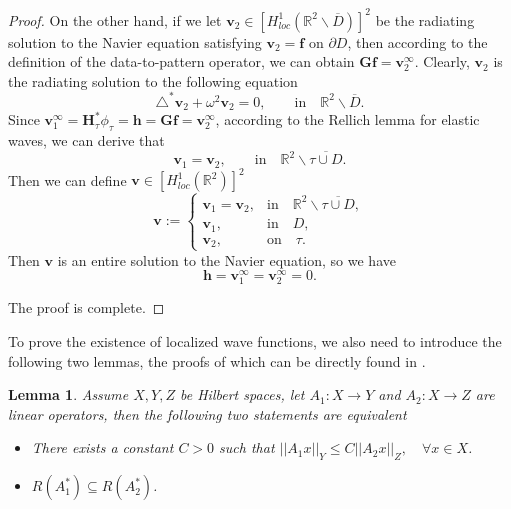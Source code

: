 \documentclass[11pt,reqno,twoside]{amsart}
\newtheorem{lem}{Lemma}[section]
\theoremstyle{definition}
\theoremstyle{remark}
\numberwithin{equation}{section}
\begin{document}
\begin{proof}
	On the other hand, if we let $\mathbf v _2 \in \left[ H^1_{loc} \left( \mathbb R^2 \backslash \overline{D} \right) \right] ^2$ be the radiating solution to the Navier equation satisfying $ \mathbf v _2= \mathbf f$ on $\partial D $, then according to the definition of the data-to-pattern operator, we can obtain $ \mathbf G \mathbf f= \mathbf v^{\infty} _2$. Clearly, $\mathbf v _2 $ is the radiating solution to the following equation
   \begin{equation}
	\triangle ^* \mathbf v _2 + \omega ^2 \mathbf v _2 =0,\qquad \mbox{in}\quad \mathbb R^2 \backslash \overline{D}.
   \end{equation}
	Since $\mathbf v^{\infty} _1=\mathbf H^*_{\tau} \phi _{\tau}= \mathbf h= \mathbf G \mathbf f= \mathbf v^{\infty} _2$, according to the Rellich lemma for elastic waves, we can derive that
	$$
	\mathbf v _1=\mathbf v _2, \qquad \mbox{in}\quad \mathbb R^2 \backslash \overline{\tau \cup D}.
	$$
	Then we can define $\mathbf v \in \left[ H^1_{loc} \left( \mathbb R^2 \right) \right] ^2$
	\begin{equation}
		\mathbf v:=
		\begin{cases}
			\mathbf v _1=\mathbf v _2,& \mbox{in}\quad \mathbb R^2 \backslash \overline{\tau \cup D},\\
			\mathbf v _1, &  \mbox{in}\quad D ,	\\
			\mathbf v _2, &  \mbox{on}\quad \tau .
		\end{cases}
	\end{equation}
	Then $\mathbf v$ is an entire solution to the Navier equation, so we have
	$$
	\mathbf h= \mathbf v^{\infty} _1= \mathbf v^{\infty} _2 =0.
	$$
	
	The proof is complete.	
	\end{proof}

To prove the existence of localized wave functions, we also need to introduce the following two lemmas, the proofs of which can be directly found in \cite{AG20}.
\begin{lem}\label{Inquallity}%
	Assume $X, Y, Z$ be Hilbert spaces, let $A_1:X \to Y$ and $A_2: X \to Z$ are linear operators, then the following two statements are equivalent
	\begin{itemize}
		\item [(1).] There exists a constant $C>0$ such that $||A_1 x||_Y \leq C ||A_2 x||_Z, \quad \forall x \in X$.
		\item [(2).] $R \left( A^*_1 \right) \subseteq R \left( A^*_2 \right) $.
	\end{itemize}
\end{lem}
\end{document}
